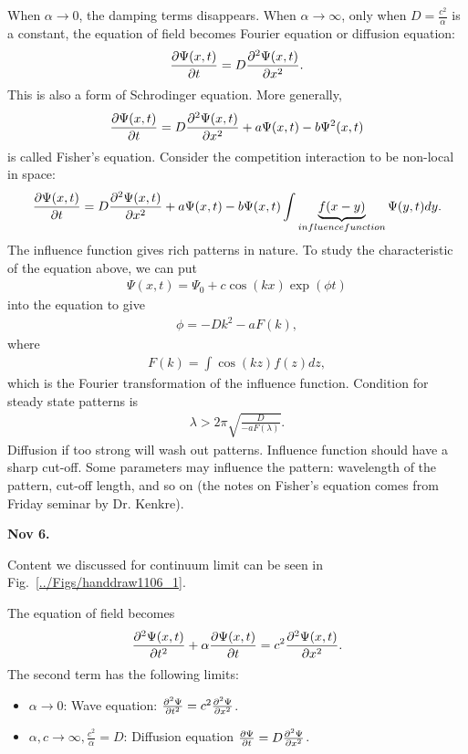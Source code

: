 When $ \alpha\rightarrow 0 $, the damping terms disappears. When $ \alpha\rightarrow \infty $, only when $ D=\frac{c^2}{\alpha} $ is a constant, the equation of field becomes Fourier equation or diffusion equation:
\begin{align}
\frac{\partial {\Psi(x,t)}}{\partial t}=D\frac{\partial^2 {\Psi(x,t)}}{\partial {x}^2}.
\end{align}
This is also a form of Schrodinger equation. More generally, 
\begin{align}
\frac{\partial {\Psi(x,t)}}{\partial t}=D\frac{\partial^2 {\Psi(x,t)}}{\partial {x}^2}+a\Psi(x,t)-b\Psi^2(x,t)
\end{align}
is called Fisher's equation. Consider the competition interaction to be non-local in space:
\begin{align}
\frac{\partial {\Psi(x,t)}}{\partial t}=D\frac{\partial^2 {\Psi(x,t)}}{\partial {x}^2}+a\Psi(x,t)-b\Psi(x,t)\int  \underbrace{f(x-y)}_{influence function}\Psi(y,t)dy.
\end{align}
The influence function gives rich patterns in nature. To study the characteristic of the equation above, we can put 
\begin{align}
\Psi(x,t)= \Psi_0 + c\cos(kx)\exp(\phi t)
\end{align}
into the equation to give
\begin{align}
\phi=-Dk^2 -a F(k),
\end{align}
where 
\begin{align}
F(k)=\int \cos(kz) f(z) dz,
\end{align}
which is the Fourier transformation of the influence function. Condition for steady state patterns is
\begin{align}
\lambda>2\pi \sqrt{\frac{D}{-a F(\lambda)}}.
\end{align}
Diffusion if too strong will wash out patterns. Influence function should have a sharp cut-off. Some parameters may influence the pattern: wavelength of the pattern, cut-off length, and so on (the notes on Fisher's equation comes from Friday seminar by Dr. Kenkre). 


\textbf{Nov 6.}

Content we discussed for continuum limit can be seen in Fig.~\ref{../Figs/handdraw1106_1}.

The equation of field becomes
\begin{align}
\frac{\partial^2 {\Psi(x,t)}}{\partial t^2} + \alpha \frac{\partial {\Psi(x,t)}}{\partial t} = c^2 \frac{\partial^2 {\Psi(x,t)}}{\partial {x}^2}.
\end{align}
The second term has the following limits:
\begin{itemize}
\item $ \alpha\rightarrow 0 $: Wave equation: $ \frac{\partial^2 {\Psi}}{\partial t^2}=c^2 \frac{\partial^2 {\Psi}}{\partial {x}^2} $.
\item $ \alpha,c \rightarrow \infty, \frac{c^2}{\alpha}=D $: Diffusion equation $ \frac{\partial {\Psi}}{\partial t}=D \frac{\partial^2 {\Psi}}{\partial {x}^2} $. 
\end{itemize}


